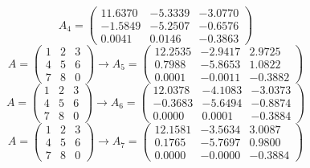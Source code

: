 \documentclass{beamer}
\begin{document}
\begin{frame}
\begin{overlayarea}{\textwidth}{0.4\textheight}
{\begin{equation*}
        A_4 =
        \begin{pmatrix}
          11.6370 &  -5.3339 &  -3.0770\\
          -1.5849 &  -5.2507 &  -0.6576\\
          0.0041  &  0.0146  & -0.3863
        \end{pmatrix}
      \end{equation*}
    }
    {
      \begin{equation*}
        A =
        \begin{pmatrix}
          1 & 2 & 3 \\
          4 & 5 & 6 \\
          7 & 8 & 0
        \end{pmatrix} \rightarrow
        A_5 =
        \begin{pmatrix}
          12.2535 &  -2.9417 &   2.9725\\
          0.7988  & -5.8653  &  1.0822\\
          0.0001  & -0.0011  & -0.3882
        \end{pmatrix}
      \end{equation*}
    }
    {
      \begin{equation*}
        A =
        \begin{pmatrix}
          1 & 2 & 3 \\
          4 & 5 & 6 \\
          7 & 8 & 0
        \end{pmatrix} \rightarrow
        A_6 =
        \begin{pmatrix}
          12.0378 &  -4.1083 &  -3.0373\\
          -0.3683 &  -5.6494 &  -0.8874\\
          0.0000  &  0.0001  & -0.3884
        \end{pmatrix}
      \end{equation*}
    }
    {
      \begin{equation*}
        A =
        \begin{pmatrix}
          1 & 2 & 3 \\
          4 & 5 & 6 \\
          7 & 8 & 0
        \end{pmatrix} \rightarrow
        A_7 =
        \begin{pmatrix}
          12.1581 &  -3.5634 &   3.0087 \\
          0.1765  & -5.7697  &  0.9800 \\
          0.0000  & -0.0000  & -0.3884
        \end{pmatrix}
      \end{equation*}
    }
  \end{overlayarea}
\end{frame}
\end{document}
